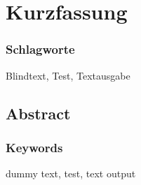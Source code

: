 \chapter{Kurzfassung}
\blindtext %

\subsection*{Schlagworte}
Blindtext, Test, Textausgabe


\begin{otherlanguage}{english}

\section*{Abstract}
\blindtext %

\subsection*{Keywords}
dummy text, test, text output

\end{otherlanguage}
